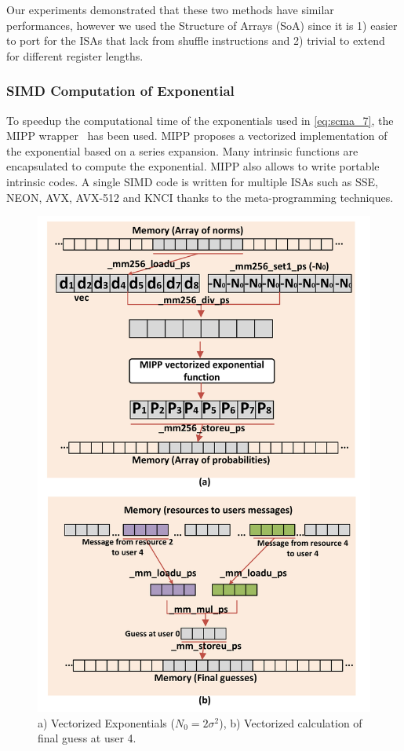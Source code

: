 Our experiments demonstrated that these two methods have similar performances,
however we used the Structure of Arrays (SoA) since it is 1) easier to port for
the ISAs that lack from shuffle instructions and 2) trivial to extend for
different register lengths.

\subsubsection{SIMD Computation of Exponential}

To speedup the computational time of the exponentials used in \eqref{eq:scma_7},
the MIPP wrapper~\cite{Cassagne2018} has been used. MIPP proposes a vectorized
implementation of the exponential based on a series expansion. Many intrinsic
functions are encapsulated to compute the exponential. MIPP also allows to write
portable intrinsic codes. A single SIMD code is written for multiple ISAs such
as SSE, NEON, AVX, AVX-512 and KNCI thanks to the meta-programming techniques.

\begin{figure}
  \centering
  \includegraphics[width=0.70\linewidth]{scma/simd_exp_mul/simd_exp_mul}
  \caption{a) Vectorized Exponentials ($N_ 0 = 2\sigma^2$),
           b) Vectorized calculation of final guess at user 4.}
  \label{fig:scma_simd_exp_mul}
\end{figure}

